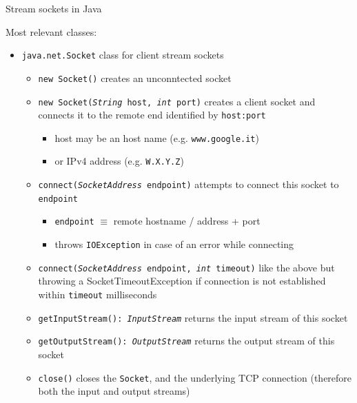 \documentclass[presentation]{beamer}\mode<presentation>{\usetheme{AMSBolognaFC}}
\begin{document}
\begin{frame}[c, allowframebreaks]{Stream sockets in Java}

    Most relevant classes:
    \bigskip
    \begin{itemize}
        \item \texttt{java.net.\alert{Socket}} class for \alert{client} stream sockets 
        \begin{itemize}
            \item \alert{\texttt{new Socket()}} creates an unconntected socket
            \item \alert{\texttt{new Socket(\textit{String} host, \textit{int} port)}} creates a client socket and connects it to the remote end identified by \texttt{host:port}
            \begin{itemize}
                \item host may be an host name (e.g. \texttt{www.google.it})
                \item or IPv4 address (e.g. \texttt{W.X.Y.Z})
            \end{itemize}
            \item \alert{\texttt{connect(\textit{SocketAddress} endpoint)}} attempts to connect this socket to \texttt{endpoint}
            \begin{itemize}
                \item \texttt{endpoint} $\equiv$ remote hostname / address + port
                \item throws \texttt{IOException} in case of an error while connecting
            \end{itemize}

            \item \alert{\texttt{connect(\textit{SocketAddress} endpoint, \textit{int} timeout)}} like the above but throwing a \alert{SocketTimeoutException} if connection is not established within \texttt{timeout} milliseconds

            \item \alert{\texttt{getInputStream(): \textit{InputStream}}} returns the input stream of this socket

            \item \alert{\texttt{getOutputStream(): \textit{OutputStream}}} returns the output stream of this socket

            \item \alert{\texttt{close()}} closes the \texttt{Socket}, and the underlying TCP connection (therefore both the input and output streams)
            

\end{itemize}
\end{itemize}
\end{frame}
\end{document}
